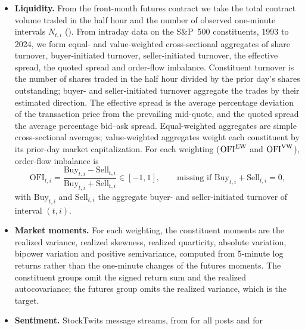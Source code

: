 \begin{itemize}
  $\ser{sumpret2}{\mathrm{RS}^{+}}_{t,i}$ the positive realized semivariance of
  \citet{BarndorffNielsenKinnebrockShephard2010}, $\ser{sumbipow}{\mathrm{BV}}_{t,i}$ the bipower variation of
  \citet{BarndorffNielsenShephard2004} without its $\pi/2$ factor, and $\ser{sumautocov}{\mathrm{AC}}_{t,i}$ the
  first-order realized autocovariance. The realized variance itself is the target and not a predictor.
\item \textbf{Liquidity.} From the front-month futures contract we take the total contract volume traded in the half
  hour and the number of observed one-minute intervals $N_{t,i}$\ifrawseries{} ()\fi. From intraday
  data on the S\&P~500 constituents, 1993 to 2024, we form equal- and value-weighted cross-sectional aggregates of
  share turnover, buyer-initiated turnover, seller-initiated turnover, the effective spread, the quoted spread and
  order-flow imbalance. Constituent turnover is the number of shares traded in the half hour divided by the prior
  day's shares outstanding; buyer- and seller-initiated turnover aggregate the trades by their estimated direction.
  The effective spread is the average percentage deviation of the transaction price from the prevailing mid-quote,
  and the quoted spread the average percentage bid--ask spread. Equal-weighted aggregates are simple cross-sectional
  averages; value-weighted aggregates weight each constituent by its prior-day market capitalization. For each
  weighting ($\ser{ofi_ewstock}{\mathrm{OFI}^{\mathrm{EW}}}$ and $\ser{ofi_vwstock}{\mathrm{OFI}^{\mathrm{VW}}}$),
  order-flow imbalance is
  \[
    \mathrm{OFI}_{t,i} = \frac{\mathrm{Buy}_{t,i} - \mathrm{Sell}_{t,i}}{\mathrm{Buy}_{t,i} + \mathrm{Sell}_{t,i}}
      \in [-1, 1],
    \qquad \text{missing if } \mathrm{Buy}_{t,i} + \mathrm{Sell}_{t,i} = 0 ,
  \]
  with $\mathrm{Buy}_{t,i}$ and $\mathrm{Sell}_{t,i}$ the aggregate buyer- and seller-initiated turnover of interval
  $(t,i)$.
\item \textbf{Market moments.} For each weighting, the \bkSizeMew{} constituent moments are the realized variance,
  realized skewness, realized quarticity, absolute variation, bipower variation and positive semivariance, computed
  from 5-minute log returns rather than the one-minute changes of the futures moments. The constituent groups omit
  the signed return sum and the realized autocovariance; the futures group omits the realized variance, which is the
  target.
\item \textbf{Sentiment.} StockTwits message streams, from \rhlvStAttFirst{} for all posts and \rhlvStSentFirst{} for

\end{itemize}
